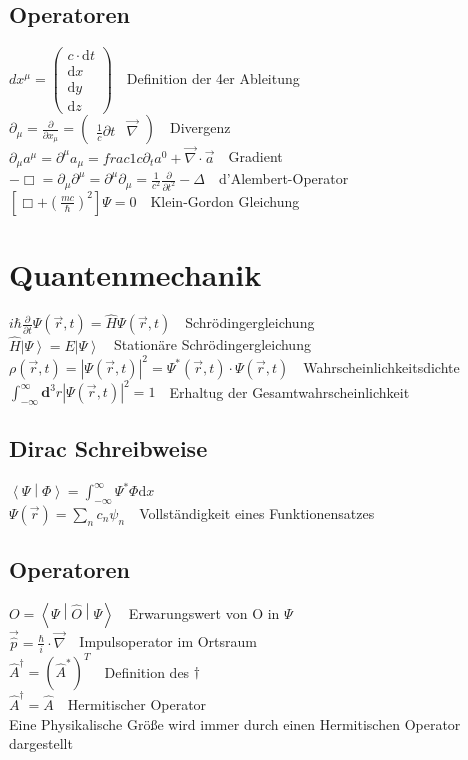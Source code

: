 \documentclass[8pt,a4paper]{extarticle}
\newcommand{\frml}[2]{$#1$~\hfill~#2\\}
\newcommand{\pder}[2]{\frac{\partial#1}{\partial#2}}
\newcommand{\ket}[1]{\left|#1\right\rangle}
\newcommand{\oper}[1]{\hat#1}
\newcommand{\braket}[2]                               %
{\left\langle#1 \middle| #2\right\rangle}
\newcommand{\bratenket}[3]                            %
{\left\langle#1 \middle| #2 \middle|  %
#3\right\rangle}
\begin{document}
\begin{multicols}{3}
\subsection{Operatoren}
\frml{dx^\mu = \begin{pmatrix} c\cdot\mathrm{d} t \\ \mathrm{d} x \\ \mathrm{d} y \\ \mathrm{d} z \end{pmatrix}}{Definition der 4er Ableitung}
\frml{\partial_\mu = \pder{}{x_\mu} = \begin{pmatrix} \frac{1}{c} \partial t & \vec{\nabla}\end{pmatrix}}{Divergenz}
\frml{\partial_\mu a^\mu = \partial^\mu a_\mu = frac{1}{c}\partial_t a^0+\vec{\nabla}\cdot\vec{a}}{Gradient}
\frml{-\Box = \partial_\mu \partial^\mu = \partial^\mu \partial_\mu = \frac{1}{c^2}\pder{}{t^2}-\Delta}{d'Alembert-Operator}

\frml{\left[\Box +  \left( \frac{mc}{\hbar} \right)^2\right]\Psi = 0}{Klein-Gordon Gleichung}

\section{Quantenmechanik}
\frml{i\hbar\pder{}{t}\Psi(\vec{r},t) = \oper{H}\Psi(\vec{r},t)}{Schr\"odingergleichung}
\frml{\oper{H}\ket{\Psi} = E\ket{\Psi}}{Station\"are Schr\"odingergleichung}
\frml{\rho(\vec{r}, t) = \left| \Psi(\vec{r}, t) \right|^2 = \Psi^*(\vec{r}, t) \cdot \Psi(\vec{r}, t)}{Wahrscheinlichkeitsdichte}
\frml{\int_{-\infty}^{\infty}\mathbf{d}^3r \left|\Psi(\vec{r},t)\right|^2 = 1}{Erhaltug der Gesamtwahrscheinlichkeit}
\subsection{Dirac Schreibweise}
\frml{\braket{\Psi}{\Phi} = \int_{-\infty}^{\infty}\Psi^*\Phi \mathrm{d}x}{}
\frml{\Psi(\vec{r}) = \sum_{n}c_{n}\psi_{n}}{Vollst\"andigkeit eines Funktionensatzes}
\subsection{Operatoren}
\frml{O = \bratenket{\Psi}{\oper{O}}{\Psi}}{Erwarungswert von O in $\Psi$}
\frml{\vec{\oper{p}} = \frac{\hbar}{i}\cdot \vec{\nabla}}{Impulsoperator im Ortsraum}
\frml{\oper{A}^\dagger = (\oper{A}^*)^T}{Definition des $\dagger$}
\frml{\oper{A}^\dagger = \oper{A}}{Hermitischer Operator}
Eine Physikalische Gr\"o{\ss}e wird immer durch einen Hermitischen Operator dargestellt


\end{multicols}
\end{document}
